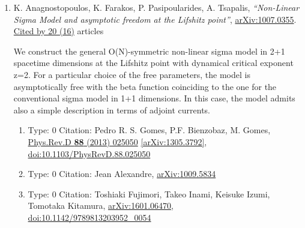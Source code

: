\documentclass[a4paper,10pt]{article}
\begin{document}
\begin{enumerate}
\begin{enumerate}
\end{enumerate}
\item K. Anagnostopoulos, K. Farakos, P. Pasipoularides, A. Tsapalis, {\it ``Non-Linear Sigma Model and asymptotic freedom at the Lifshitz point''}, \href{https://arxiv.org/abs/1007.0355}{arXiv:1007.0355}.
\\\href{https://inspirehep.net/literature/?q=refersto%3Arecid%3A860357}{Cited by 20 (16)} articles

We construct the general O(N)-symmetric non-linear sigma model in 2+1 spacetime dimensions at the Lifshitz point with dynamical critical exponent z=2. For a particular choice of the free parameters, the model is asymptotically free with the beta function coinciding to the one for the conventional sigma model in 1+1 dimensions. In this case, the model admits also a simple description in terms of adjoint currents.
\begin{enumerate}
  \item Type: 0 Citation: Pedro R. S. Gomes, P.F. Bienzobaz, M. Gomes, \href{https://www.doi.org/10.1103/PhysRevD.88.025050}{Phys.Rev.D {\bf 88} (2013) 025050}  \href{https://arxiv.org/abs/1305.3792}{[arXiv:1305.3792]},\\\href{https://www.doi.org/10.1103/PhysRevD.88.025050}{doi:10.1103/PhysRevD.88.025050}
  \item Type: 0 Citation: Jean Alexandre, \href{https://arxiv.org/abs/1009.5834}{arXiv:1009.5834}
  \item Type: 0 Citation: Toshiaki Fujimori, Takeo Inami, Keisuke Izumi, Tomotaka Kitamura, \href{https://arxiv.org/abs/1601.06470}{arXiv:1601.06470},\\\href{https://www.doi.org/10.1142/9789813203952_0054}{doi:10.1142/9789813203952\_0054}

\end{enumerate}
\end{enumerate}
\end{document}
